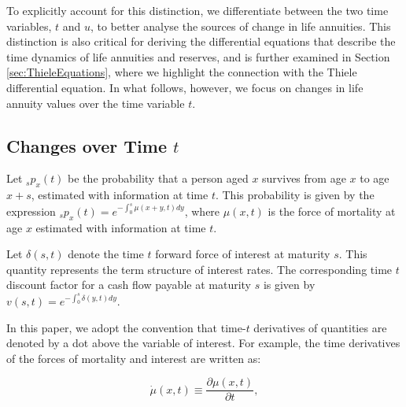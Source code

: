 \documentclass[12pt]{article}
\begin{document}
To explicitly account for this distinction, we differentiate between the two time variables, \( t \) and \( u \), to better analyse the sources of change in life annuities. This distinction is also critical for deriving the differential equations that describe the time dynamics of life annuities and reserves, and is further examined in Section \ref{sec:ThieleEquations}, where we highlight the connection with the Thiele differential equation. In what follows, however, we focus on changes in life annuity values over the time variable \(t\).

\subsection{Changes over Time $t$}


Let \({}_s p_x(t) \) be the probability that a person aged \( x \) survives from age \( x \) to age \( x+s \), estimated with information at time $t$. This probability is given by the expression ${}_sp_x(t)=e^{-\int_{0}^{s}\mu(x+y,t)dy}$, where \(\mu(x,t)\) is the force of mortality at age \(x\) estimated with information at time $t$.

Let \( \delta(s,t) \) denote the time \( t \) forward force of interest at maturity \( s \). This quantity represents the term structure of interest rates. The corresponding time \( t \) discount factor for a cash flow payable at maturity \( s \) is given by ${v}(s,t)=e^{-\int_{0}^{s}\delta(y,t)dy}$.

In this paper, we adopt the convention that time-$t$ derivatives of quantities are denoted by a dot above the variable of interest. For example, the time derivatives of the forces of mortality and interest are written as:


\begin{equation} \label{eq:mudot}
\dot{\mu}(x,t)\equiv\frac{\partial\mu(x,t)}{\partial t},
\end{equation}
\end{document}
